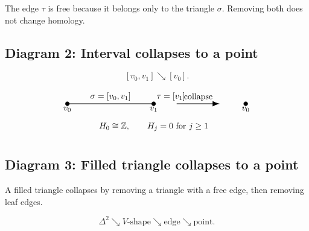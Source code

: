 \documentclass[12pt,a4paper]{article}
\theoremstyle{notespace}
\begin{document}
The edge \(\tau\) is free because it belongs only to the triangle \(\sigma\). Removing both does not change homology.

\subsection{Diagram 2: Interval collapses to a point}

\[
[v_0,v_1]\searrow [v_0].
\]

\[
\begin{tikzpicture}[scale=1.2]
	\coordinate (A) at (0,0);
	\coordinate (B) at (3,0);
	
	\draw[thick] (A)--(B);
	\filldraw (A) circle (2pt);
	\filldraw (B) circle (2pt);
	
	\node[below] at (A) {$v_0$};
	\node[below] at (B) {$v_1$};
	\node[above] at (1.5,0) {$\sigma=[v_0,v_1]$};
	\node[above right] at (B) {$\tau=[v_1]$};
	
	\draw[-{Latex[length=3mm]},thick] (3.8,0)--(5.3,0);
	\node[above] at (4.55,0) {$\text{collapse}$};
	
	\coordinate (C) at (6.2,0);
	\filldraw (C) circle (2pt);
	\node[below] at (C) {$v_0$};
	
	\node at (3,-0.8) {$H_0\cong \mathbb Z,\qquad H_j=0\text{ for }j\geq 1$};
\end{tikzpicture}
\]

\subsection{Diagram 3: Filled triangle collapses to a point}

A filled triangle collapses by removing a triangle with a free edge, then removing leaf edges.

\[
\Delta^2
\searrow
\text{\(V\)-shape}
\searrow
\text{edge}
\searrow
\text{point}.
\]
\end{document}
